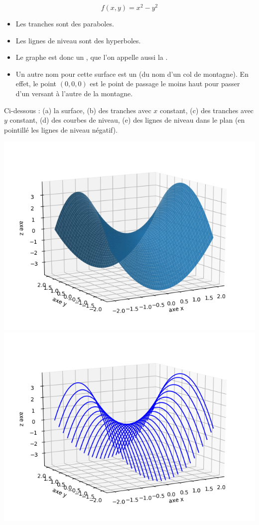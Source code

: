 \documentclass[11pt, class=report,crop=false]{standalone}
\begin{document}
\begin{exemple}
$$f(x,y) = x^2-y^2$$

\begin{itemize}
  \item Les tranches sont des paraboles.
  \item Les lignes de niveau sont des hyperboles.
  \item Le graphe est donc un , que l'on appelle aussi la .
  \item Un autre nom pour cette surface est un  (du nom d'un col de montagne). 
  En effet, le point $(0,0,0)$ est le point de passage le moins haut pour passer d'un versant à l'autre de la montagne. 
\end{itemize}


Ci-dessous : (a) la surface, (b) des tranches avec $x$ constant, (c) des tranches avec $y$ constant, (d) des courbes de niveau, (e) des lignes de niveau dans le plan (en pointillé les lignes de niveau négatif).
\begin{center}
    \includegraphics[scale=\myscale,scale=0.5]{figures/fonctions-quadra-3a}
    \includegraphics[scale=\myscale,scale=0.5]{figures/fonctions-quadra-3b}

\end{center}
\end{exemple}
\end{document}

